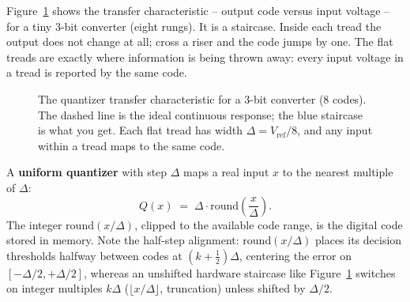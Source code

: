 Figure~\ref{ch19:fig-staircase} shows the transfer characteristic -- output code versus input
voltage -- for a tiny 3-bit converter (eight rungs). It is a staircase. Inside each tread the
output does not change at all; cross a riser and the code jumps by one. The flat treads are
exactly where information is being thrown away: every input voltage in a tread is reported by the
same code.

\begin{figure}[H]
\centering
{}
\caption{The quantizer transfer characteristic for a 3-bit converter (8 codes). The dashed line
is the ideal continuous response; the blue staircase is what you get. Each flat tread
has width $\Delta = V_{\mathrm{ref}}/8$, and any input within a tread maps to the same code.}
\label{ch19:fig-staircase}
\end{figure}

\begin{definition}
\label{ch19:def-quantizer}
A \textbf{uniform quantizer} with step $\Delta$ maps a real input $x$ to the nearest multiple of
$\Delta$:
\[
  Q(x) \;=\; \Delta \cdot \mathrm{round}\!\left(\frac{x}{\Delta}\right).
\]
The integer $\mathrm{round}(x/\Delta)$, clipped to the available code range, is the digital code
stored in memory. Note the half-step alignment: $\mathrm{round}(x/\Delta)$ places its decision thresholds halfway between codes at $(k+\tfrac{1}{2})\Delta$, centering the error on $[-\Delta/2,+\Delta/2]$, whereas an unshifted hardware staircase like Figure~\ref{ch19:fig-staircase} switches on integer multiples $k\Delta$ ($\lfloor x/\Delta\rfloor$, truncation) unless shifted by $\Delta/2$.
\end{definition}

